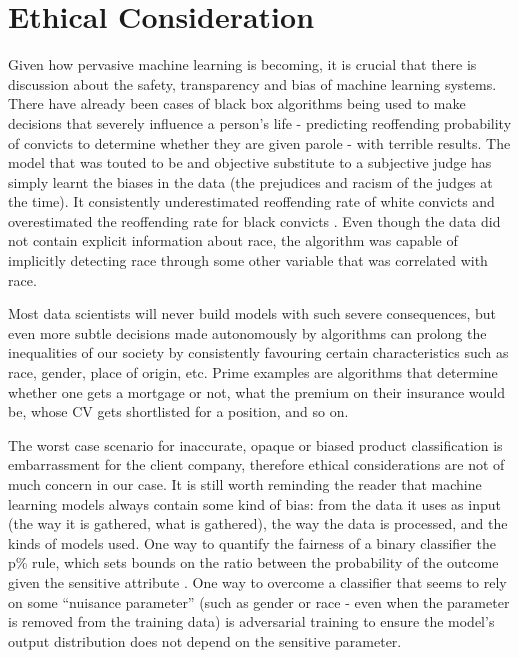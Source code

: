 \section{Ethical Consideration}

Given how pervasive  machine learning is becoming, it is crucial that there is discussion about the safety, transparency and bias of machine learning systems.
There have already been cases of black box algorithms being used to make decisions that severely influence a person's life -  predicting reoffending probability  of convicts to determine  whether they are given parole - with terrible results.
The model that was touted to be and objective substitute to a subjective judge has simply learnt the biases in the data (the prejudices and racism of  the judges at the time).
It consistently underestimated reoffending rate of white convicts and overestimated the reoffending rate for black convicts \cite{propub}.
Even though the data did not contain explicit information about race, the algorithm  was capable of implicitly detecting race through some other variable that was correlated with race.

Most data scientists will never build models with such severe consequences, but even more subtle decisions  made autonomously by algorithms  can prolong the  inequalities of our society by consistently favouring certain  characteristics such as race, gender, place of origin, etc.
Prime examples are algorithms that determine whether one gets a mortgage or not, what the premium on their insurance would be, whose CV gets shortlisted for a position, and so on.

The worst case scenario for inaccurate,  opaque or biased product classification  is embarrassment for the client company,  therefore ethical considerations are not of much concern in our case.
It is still worth reminding the reader that machine learning  models always contain some kind of bias:  from the data it uses as input (the way it is gathered, what is gathered),  the way the data is processed, and the kinds of models used.
One way to quantify the fairness of a binary classifier the p\%  rule, which sets bounds on the ratio between the probability of the outcome given the sensitive attribute \cite{quantfair}.
One way to overcome a classifier that seems to rely on some ``nuisance parameter'' (such as gender or race - even when the parameter is removed from the training data) is adversarial training \cite{quantfair} to ensure the model's output distribution does not depend on the sensitive parameter.

